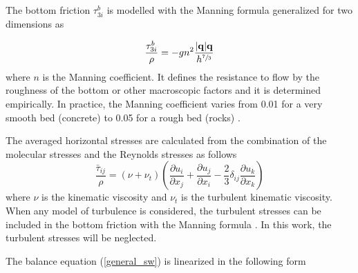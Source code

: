 \documentclass[a4paper,12pt]{elsarticle}
\newcommand{\pder}[2]{\frac{\partial#1}{\partial#2}}
\newcommand{\abs}[1]{\lvert#1\rvert}
\begin{document}
The bottom friction $\tau^b_{3i}$ is modelled with the Manning formula generalized for two dimensions as

\begin{equation}
\frac{\tau^b_{3i}}{\rho} = -gn^2\frac{\abs{\mathbf{q}}\mathbf{q}}{h^{\sfrac{7}{3}}}
\end{equation}
where $n$ is the Manning coefficient. It defines the resistance to flow by the roughness of the bottom or other macroscopic factors and it is determined empirically. In practice, the Manning coefficient varies from 0.01 for a very smooth bed (concrete) to 0.05 for a rough bed (rocks) \cite{chow1988}.


The averaged horizontal stresses are calculated from the combination of the molecular stresses and the Reynolds stresses as follows
\begin{equation} \label{stresses}
\frac{\bar{\tau}_{ij}}{\rho} = (\nu + \nu_t)\left(
    \pder{u_i}{x_j} + \pder{u_j}{x_i} -\frac{2}{3}\delta_{ij}\pder{u_k}{x_k} \right)
\end{equation}
where $\nu$ is the kinematic viscosity and $\nu_t$ is the turbulent kinematic viscosity. When any model of turbulence is considered, the turbulent stresses can be included in the bottom friction with the Manning formula \cite{blade2005}. In this work, the turbulent stresses will be neglected.

The balance equation (\ref{general_sw}) is linearized in the following form
\end{document}
